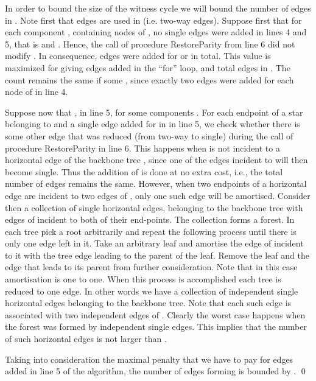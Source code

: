 \documentclass[11pt,envcountsame,oribibl]{llncs}
\begin{document}
In order to bound the size of the witness cycle we will bound the number
of edges in . Note first that  edges are used in 
(i.e.  two-way edges). Suppose first that for each component , containing 
nodes of , no single edges were added in lines 4 and 5,
that is  and .
Hence, the call of procedure {\sc RestoreParity}  from line 6 did not
modify . In consequence,  edges were added for 
or  in total. This value is maximized
for  giving  edges added in the ``for'' loop, and  total
edges in . The count remains the same if some ,
since exactly two edges were added for each node of  in line 4.
\noindent

Suppose now that , in line 5, for some components .
For each endpoint   of a star belonging to  and a single edge 
added for  in  in line 5, we check whether there is some other edge
that was reduced (from two-way to single) during the call of
procedure {\sc RestoreParity} in line 6. This happens when  is not
incident to a horizontal edge of the backbone tree , since one of
the edges incident to  will then become single. Thus the addition
of  is done at no extra cost, i.e., the total number of edges remains the same.
However, when
two endpoints of a horizontal edge are incident to two edges of , only
one such edge will be amortised. Consider then a collection of single horizontal edges,
belonging to the backbone tree  with edges of  incident to both of
their end-points.
The collection forms a forest. In each tree pick a root arbitrarily and
repeat the following
process until there is only one edge left in it. Take an arbitrary leaf and amortise
the edge of  incident to it with the tree edge leading to the parent of the leaf.
Remove the leaf and the edge that leads to its parent from further consideration.
Note that in this case amortisation is one to one. When this process is accomplished
each tree is reduced to one edge. In other words we have a collection of independent
single horizontal edges belonging to the backbone tree. Note that each such edge
is associated with two independent edges of . Clearly the worst case
happens when the forest was formed by independent single edges. This implies that the
number of such horizontal edges is not larger than .

Taking into consideration the maximal penalty that we have to pay for edges
added in line 5 of the algorithm, the number of edges forming  is
bounded by . \hfill\qed
\end{document}
